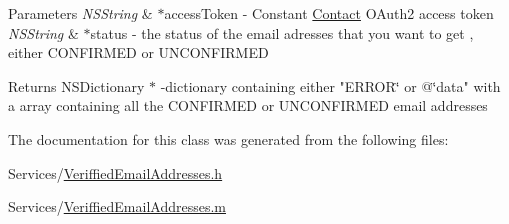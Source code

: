\begin{DoxyParams}{Parameters}
{\em N\-S\-String} & $\ast$access\-Token -\/ Constant \hyperlink{interface_contact}{Contact} O\-Auth2 access token \\
\hline
{\em N\-S\-String} & $\ast$status -\/ the status of the email adresses that you want to get , either C\-O\-N\-F\-I\-R\-M\-E\-D or U\-N\-C\-O\-N\-F\-I\-R\-M\-E\-D\\
\hline
\end{DoxyParams}
\begin{DoxyReturn}{Returns}
N\-S\-Dictionary $\ast$ -\/dictionary containing either "E\-R\-R\-O\-R\char`\"{} or @\char`\"{}data" with a array containing all the C\-O\-N\-F\-I\-R\-M\-E\-D or U\-N\-C\-O\-N\-F\-I\-R\-M\-E\-D email addresses 
\end{DoxyReturn}


The documentation for this class was generated from the following files\-:\begin{DoxyCompactItemize}
\item 
Services/\hyperlink{_veriffied_email_addresses_8h}{Veriffied\-Email\-Addresses.\-h}\item 
Services/\hyperlink{_veriffied_email_addresses_8m}{Veriffied\-Email\-Addresses.\-m}\end{DoxyCompactItemize}
